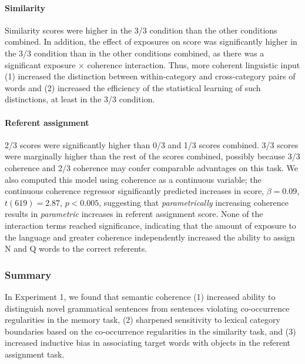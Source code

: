 \documentclass[man,floatsintext]{apa6}
\begin{document}
\paragraph{Similarity} Similarity scores were higher in the 3/3 condition than the other conditions combined. In addition, the effect of exposures on score was significantly higher in the 3/3 condition than in the other conditions combined, as there was a significant exposure $\times$ coherence interaction. Thus, more coherent linguistic input (1) increased the distinction between within-category and cross-category pairs of words and (2) increased the efficiency of the statistical learning of such distinctions, at least in the 3/3 condition.

\paragraph{Referent assignment}

2/3 scores were significantly higher than 0/3 and 1/3 scores combined. 3/3 scores were marginally higher than the rest of the scores combined, possibly because 3/3 coherence and 2/3 coherence may confer comparable advantages on this task. We also computed this model using coherence as a continuous variable; the continuous coherence regressor significantly predicted increases in score, $\beta = 0.09$, $t(619) = 2.87$, $p < 0.005$, suggesting that \emph{parametrically} increasing coherence results in \emph{parametric} increases in referent assignment score. None of the interaction terms reached significance, indicating that the amount of exposure to the language and greater coherence independently increased the ability to assign N and Q words to the correct referents.


\subsubsection{Summary}

In Experiment 1, we found that semantic coherence (1) increased ability to distinguish novel grammatical sentences from sentences violating co-occurrence regularities in the memory task, (2) sharpened sensitivity to lexical category boundaries based on the co-occurrence regularities in the similarity task, and (3) increased inductive bias in associating target words with objects in the referent assignment task.
\end{document}
